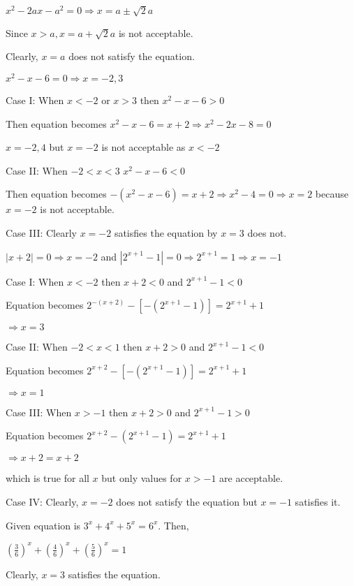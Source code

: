   $x^2 - 2ax - a^2 = 0 \Rightarrow x = a \pm \sqrt{2}a$

  Since $x > a, x = a + \sqrt{2}a$ is not acceptable.

  Clearly, $x = a$ does not satisfy the equation.
\item $x^2 - x - 6 = 0 \Rightarrow x = -2, 3$

  Case I: When $x < -2$ or $x > 3$ then $x^2 - x - 6 > 0$

  Then equation becomes $x^2 - x - 6 = x + 2 \Rightarrow x^2 - 2x - 8 = 0$

  $x = -2, 4$ but $x = -2$ is not acceptable as $x < -2$

  Case II: When $-2 < x < 3$ $x^2 - x - 6 < 0$

  Then equation becomes $-(x^2 - x - 6) = x + 2 \Rightarrow x^2 - 4 = 0 \Rightarrow x = 2$ because $x =
  -2$ is not acceptable.

  Case III: Clearly $x = -2$ satisfies the equation by $x = 3$ does not.
\item $|x + 2| = 0 \Rightarrow x = -2$ and $|2^{x + 1} - 1| = 0 \Rightarrow 2^{x + 1} = 1 \Rightarrow x = -1$

  Case I: When $x < -2$ then $x + 2 < 0$ and $2^{x + 1} - 1 < 0$

  Equation becomes $2^{-(x + 2)} - [-(2^{x + 1} - 1)] = 2^{x + 1} + 1$

  $\Rightarrow x = 3$

  Case II: When $-2 < x < 1$ then $x + 2 > 0$ and $2^{x + 1} - 1 < 0$

  Equation becomes $2^{x + 2} - [-(2^{x + 1} - 1)] = 2^{x + 1} + 1$

  $\Rightarrow x = 1$

  Case III: When $x > -1$ then $x + 2 > 0$ and $2^{x + 1} - 1 > 0$

  Equation becomes $2^{x + 2} - (2^{x + 1} - 1) = 2^{x + 1} + 1$

  $\Rightarrow x + 2 = x + 2$

  which is true for all $x$ but only values for $x > -1$ are acceptable.

  Case IV: Clearly, $x = -2$ does not satisfy the equation but $x = -1$ satisfies it.
\item Given equation is $3^x + 4^x + 5^x = 6^x$. Then,

  $\left(\frac{3}{6}\right)^x + \left(\frac{4}{6}\right)^x + \left(\frac{5}{6}\right)^x = 1$

  Clearly, $x = 3$ satisfies the equation.

